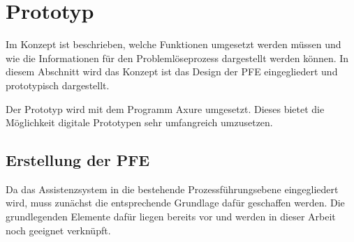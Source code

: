 \chapter{Prototyp}
\label{Prototyp}
Im Konzept ist beschrieben, welche Funktionen umgesetzt werden müssen und wie die Informationen für den Problemlöseprozess dargestellt werden können. In diesem Abschnitt wird das Konzept ist das Design der PFE eingegliedert und prototypisch dargestellt.

Der Prototyp wird mit dem Programm Axure  umgesetzt. Dieses bietet die Möglichkeit digitale Prototypen sehr umfangreich umzusetzen. 

\section{Erstellung der PFE}
Da das Assistenzsystem in die bestehende Prozessführungsebene eingegliedert wird, muss zunächst die entsprechende Grundlage dafür geschaffen werden. Die grundlegenden Elemente dafür liegen bereits vor und werden in dieser Arbeit noch geeignet verknüpft. 